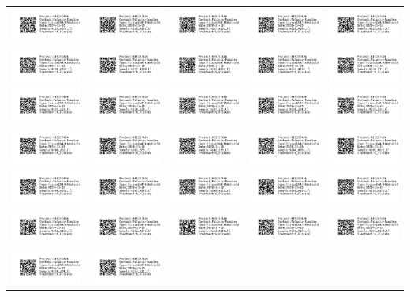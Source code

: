 \documentclass[10pt,notitlepage,letterpaper]{article}
\def\s{\phantom{xx}}
\def\w{1.27in}
\def\h{-0.030in}
\begin{document}
\pagestyle{empty}

\noindent 
\begin{tabular}[t]{ c @{\s} c @{\s} c @{\s} c @{\s} c }

\includegraphics[width=\w]{label_N225_A077_Cl} & \includegraphics[width=\w]{label_N226_A192_Cl} & \includegraphics[width=\w]{label_N227_A105_Cl} & \includegraphics[width=\w]{label_N228_A106_Cl} & \includegraphics[width=\w]{label_N229_A127_Cl} \\[\h]
\includegraphics[width=\w]{label_N230_A162_Cl} & \includegraphics[width=\w]{label_N231_A190_Cl} & \includegraphics[width=\w]{label_N232_A092_Cl} & \includegraphics[width=\w]{label_N233_A196_Cl} & \includegraphics[width=\w]{label_N234_215_Cl} \\[\h]
\includegraphics[width=\w]{label_N235_226_Cl} & \includegraphics[width=\w]{label_N236_220_Cl} & \includegraphics[width=\w]{label_N237_231_Cl} & \includegraphics[width=\w]{label_N238_254_Cl} & \includegraphics[width=\w]{label_N239_258_Cl} \\[\h]
\includegraphics[width=\w]{label_N240_262_Cl} & \includegraphics[width=\w]{label_N241_269_Cl} & \includegraphics[width=\w]{label_N242_293_Cl} & \includegraphics[width=\w]{label_N244_A068_Cl} & \includegraphics[width=\w]{label_N245_A071_Cl} \\[\h]
\includegraphics[width=\w]{label_N246_A072_Cl} & \includegraphics[width=\w]{label_N247_A083_Cl} & \includegraphics[width=\w]{label_N248_A131_Cl} & \includegraphics[width=\w]{label_N249_A134_Cl} & \includegraphics[width=\w]{label_N250_A155_Cl} \\[\h]
\includegraphics[width=\w]{label_N251_A165_Cl} & \includegraphics[width=\w]{label_N252_A172_Cl} & \includegraphics[width=\w]{label_N253_A185_Cl} & \includegraphics[width=\w]{label_N254_A188_Cl} & \includegraphics[width=\w]{label_N255_A198_Cl} \\[\h]
\includegraphics[width=\w]{label_N256_204_Cl} & \includegraphics[width=\w]{label_N257_211_Cl} & \includegraphics[width=\w]
\end{tabular}
\end{document}
